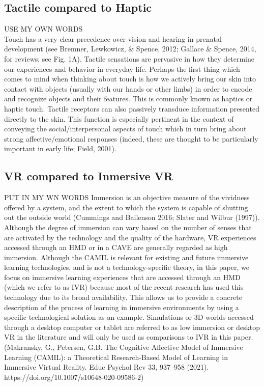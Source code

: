 \documentclass{article}
\begin{document}
 \subsection{ Tactile compared to Haptic}
 USE MY OWN WORDS \newline \\ 
Touch has a very clear precedence over vision and hearing in prenatal
development (see Bremner, Lewkowicz, \& Spence, 2012; Gallace \&
Spence, 2014, for reviews; see Fig. 1A). Tactile sensations are pervasive in how they determine our experiences and behavior in everyday life. Perhaps the first thing which comes to mind when thinking about touch is how we actively bring our skin into contact with objects (usually with our hands or other limbs) in order to encode and recognize objects and their features. This is commonly known as haptics or haptic touch. Tactile receptors can also passively transduce information presented directly to the skin. This function is especially pertinent in the context of conveying the social/interpersonal aspects of touch which in turn bring about strong affective/emotional responses (indeed, these are thought to be particularly important in early life; Field, 2001).


\subsection{ VR compared to Inmersive VR}
PUT IN MY WN WORDS
 Immersion is an objective measure of the vividness offered by a system, and the extent to which the system is capable of shutting out the outside world (Cummings and Bailenson 2016; Slater and Wilbur (1997)). 
 Although the degree of immersion can vary based on the number of senses that are activated by the technology and the quality of the hardware, VR experiences accessed through an HMD or in a CAVE are generally regarded as high immersion. Although the CAMIL is relevant for existing and future immersive learning technologies, and is not a technology-specific theory, in this paper, we focus on immersive learning experiences that are accessed through an HMD (which we refer to as IVR) because most of the recent research has used this technology due to its broad availability. This allows us to provide a concrete description of the process of learning in immersive environments by using a specific technological solution as an example. Simulations or 3D worlds accessed through a desktop computer or tablet are referred to as low immersion or desktop VR in the literature and will only be used as comparisons to IVR in this paper.
(Makransky, G., Petersen, G.B. The Cognitive Affective Model of Immersive Learning (CAMIL): a Theoretical Research-Based Model of Learning in Immersive Virtual Reality. Educ Psychol Rev 33, 937–958 (2021). https://doi.org/10.1007/s10648-020-09586-2)
\end{document}
